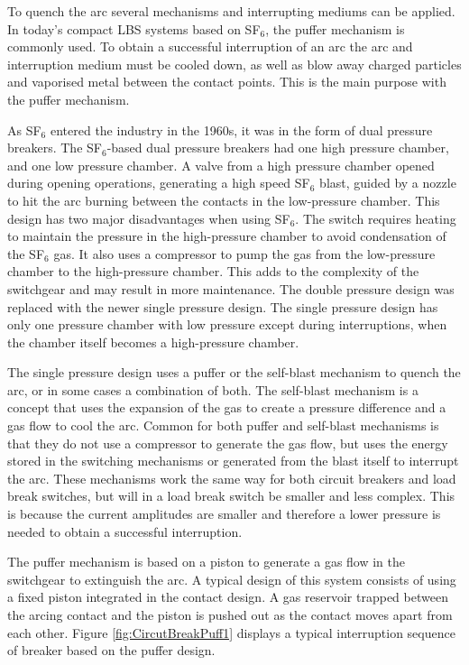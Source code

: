 \documentclass[10pt,a4paper,twoside]{article}
\begin{document}
To quench the arc several mechanisms and interrupting mediums can be applied. In today's compact LBS systems based on SF$_6$, the puffer mechanism is commonly used. To obtain a successful interruption of an arc the arc and interruption medium must be cooled down, as well as blow away charged particles and vaporised metal between the contact points. This is the main purpose with the puffer mechanism. 

As SF$_6$ entered the industry in the 1960s, it was in the form of dual pressure breakers. The SF$_6$-based dual pressure breakers had one high pressure chamber, and one low pressure chamber. A valve from a high pressure chamber opened during opening operations, generating a high speed SF$_6$ blast, guided by a nozzle to hit the arc burning between the contacts in the low-pressure chamber. This design has two major disadvantages when using SF$_6$. The switch requires heating to maintain the pressure in the high-pressure chamber to avoid condensation of the SF$_6$ gas. It also uses a compressor to pump the gas from the low-pressure chamber to the high-pressure chamber. This adds to the complexity of the switchgear and may result in more maintenance. The double pressure design was replaced with the newer single pressure design. The single pressure design has only one pressure chamber with low pressure except during interruptions, when the chamber itself becomes a high-pressure chamber.

The single pressure design uses a puffer or the self-blast mechanism to quench the arc, or in some cases a combination of both. The self-blast mechanism is a concept that uses the expansion of the gas to create a pressure difference and a gas flow to cool the arc. Common for both puffer and self-blast mechanisms is that they do not use a compressor to generate the gas flow, but uses the energy stored in the switching mechanisms or generated from the blast itself to interrupt the arc. These mechanisms work the same way for both circuit breakers and load break switches, but will in a load break switch be smaller and less complex. This is because the current amplitudes are smaller and therefore a lower pressure is needed to obtain a successful interruption.

The puffer mechanism is based on a piston to generate a gas flow in the switchgear to extinguish the arc. A typical design of this system consists of using a fixed piston integrated in the contact design. A gas reservoir trapped between the arcing contact and the piston is pushed out as the contact moves apart from each other. Figure \ref{fig:CircutBreakPuff1} displays a typical interruption sequence of breaker based on the puffer design.
\end{document}
